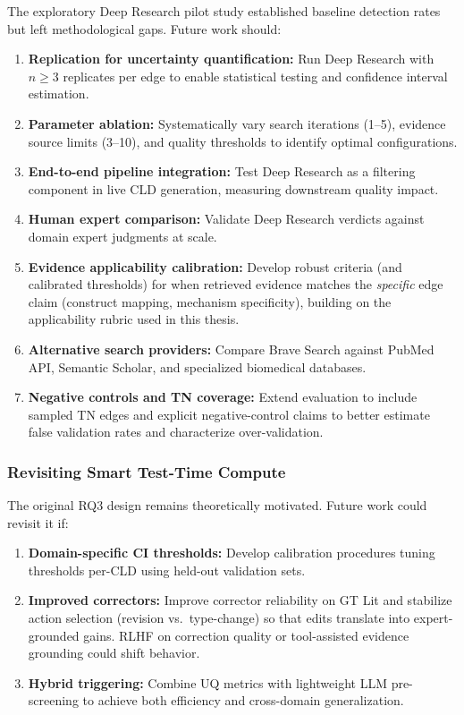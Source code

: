 The exploratory Deep Research pilot study established baseline detection rates but left methodological gaps. Future work should:
\begin{enumerate}[noitemsep]
    \item \textbf{Replication for uncertainty quantification:} Run Deep Research with $n \geq 3$ replicates per edge to enable statistical testing and confidence interval estimation.
    \item \textbf{Parameter ablation:} Systematically vary search iterations (1--5), evidence source limits (3--10), and quality thresholds to identify optimal configurations.
    \item \textbf{End-to-end pipeline integration:} Test Deep Research as a filtering component in live CLD generation, measuring downstream quality impact.
    \item \textbf{Human expert comparison:} Validate Deep Research verdicts against domain expert judgments at scale.
    \item \textbf{Evidence applicability calibration:} Develop robust criteria (and calibrated thresholds) for when retrieved evidence matches the \textit{specific} edge claim (construct mapping, mechanism specificity), building on the applicability rubric used in this thesis.
    \item \textbf{Alternative search providers:} Compare Brave Search against PubMed API, Semantic Scholar, and specialized biomedical databases.
    \item \textbf{Negative controls and TN coverage:} Extend evaluation to include sampled TN edges and explicit negative-control claims to better estimate false validation rates and characterize over-validation.
\end{enumerate}

\subsubsection{Revisiting Smart Test-Time Compute}

The original RQ3 design remains theoretically motivated. Future work could revisit it if:
\begin{enumerate}[noitemsep]
    \item \textbf{Domain-specific CI thresholds:} Develop calibration procedures tuning thresholds per-CLD using held-out validation sets.
    \item \textbf{Improved correctors:} Improve corrector reliability on GT Lit and stabilize action selection (revision vs.\ type-change) so that edits translate into expert-grounded gains. RLHF on correction quality or tool-assisted evidence grounding could shift behavior.
    \item \textbf{Hybrid triggering:} Combine UQ metrics with lightweight LLM pre-screening to achieve both efficiency and cross-domain generalization.
\end{enumerate}

